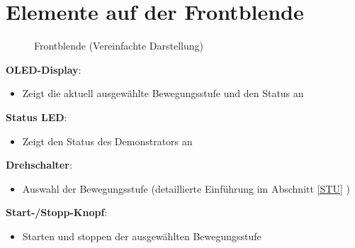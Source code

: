 %
%

\chapter{Elemente auf der Frontblende}
\begin{figure}[htb]
\begin{center}
	
	\caption{Frontblende (Vereinfachte Darstellung)} 
	\label{Frontblende}
\end{center}
\end{figure}

	\textbf{OLED-Display}: 
\begin{itemize}
	\item Zeigt die aktuell ausgewählte Bewegungsstufe und den Status an
\end{itemize}

	\textbf{Status LED}: 
\begin{itemize}
	\item Zeigt den Status des Demonstrators an
\end{itemize}

	\textbf{Drehschalter}: 
\begin{itemize}
	\item Auswahl der Bewegungsstufe (detaillierte Einführung im Abschnitt \ref{STU} )
\end{itemize}

	\textbf{Start-/Stopp-Knopf}: 
\begin{itemize}
	\item Starten und stoppen der ausgewählten Bewegungsstufe
\end{itemize}
